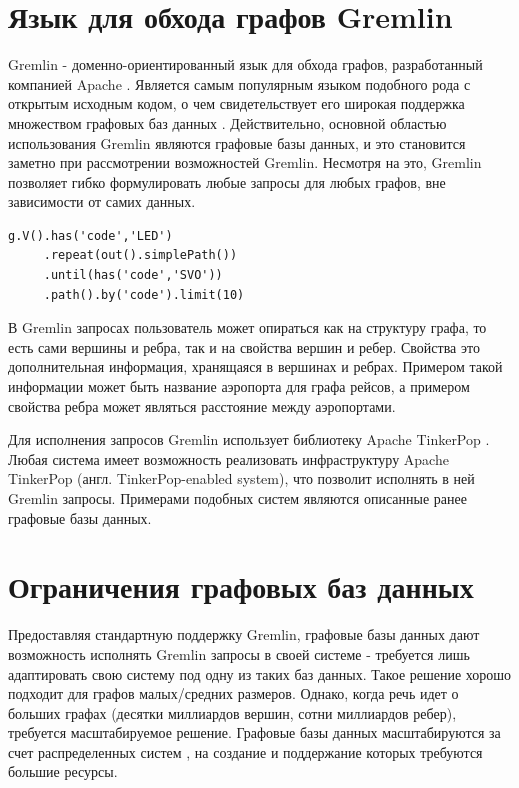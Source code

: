 \documentclass[times,specification,annotation]{itmo-student-thesis}
\begin{document}
\section{Язык для обхода графов Gremlin}

Gremlin - доменно-ориентированный язык для обхода графов, разработанный компанией Apache \cite{gremlin}. Является самым популярным языком подобного рода с открытым исходным кодом, о чем свидетельствует его широкая поддержка множеством графовых баз данных \cite{tinkerpop-enabled}. Действительно, основной областью использования Gremlin являются графовые базы данных, и это становится заметно при рассмотрении возможностей Gremlin. Несмотря на это, Gremlin позволяет гибко формулировать любые запросы для любых графов, вне зависимости от самих данных.

\begin{lstlisting}[float=!h,caption={Пример запроса на Gremlin},label={lst1}]
g.V().has('code','LED')
     .repeat(out().simplePath())
     .until(has('code','SVO'))
     .path().by('code').limit(10)
\end{lstlisting}

 В Gremlin запросах пользователь может опираться как на структуру графа, то есть сами вершины и ребра, так и на свойства вершин и ребер. Свойства это дополнительная информация, хранящаяся в вершинах и ребрах. Примером такой информации может быть название аэропорта для графа рейсов, а примером свойства ребра может являться расстояние между аэропортами. 

Для исполнения запросов Gremlin использует библиотеку Apache TinkerPop \cite{tinkerpop}. Любая система имеет возможность реализовать инфраструктуру Apache TinkerPop (англ. TinkerPop-enabled system), что позволит исполнять в ней Gremlin запросы. Примерами подобных систем являются описанные ранее графовые базы данных.

\section{Ограничения графовых баз данных}

Предоставляя стандартную поддержку Gremlin, графовые базы данных дают возможность исполнять Gremlin запросы в своей системе - требуется лишь адаптировать свою систему под одну из таких баз данных. Такое решение хорошо подходит для графов малых/средних размеров. Однако, когда речь идет о больших графах (десятки миллиардов вершин, сотни миллиардов ребер), требуется масштабируемое решение. Графовые базы данных масштабируются за счет распределенных систем \cite{graph-db-scale}, на создание и поддержание которых требуются большие ресурсы.
\end{document}
